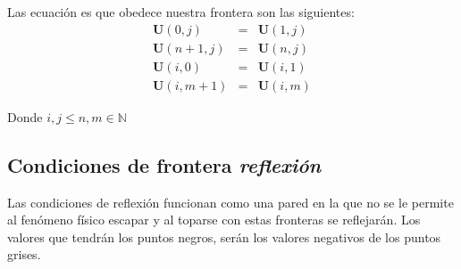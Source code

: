 \documentclass[12pt,a4paper]{book}
\begin{document}
Las ecuación  es que obedece nuestra frontera son las siguientes:
\begin{eqnarray}
\textbf{U}(0,j)&=&\textbf{U}(1,j) \\
\textbf{U}(n+1,j)&=&\textbf{U}(n,j) \\
\textbf{U}(i,0)&=&\textbf{U}(i,1) \\
\textbf{U}(i,m+1)&=&\textbf{U}(i,m) 
\end{eqnarray}

Donde $i,j \leq n,m \in \mathbb{N}$

\subsection{Condiciones de frontera \emph{reflexión}}

Las condiciones de reflexión funcionan como una pared en la que no se le permite al fenómeno físico escapar y al toparse con estas fronteras se reflejarán. Los valores que tendrán los puntos negros, serán los valores negativos de los puntos grises.
\end{document}

